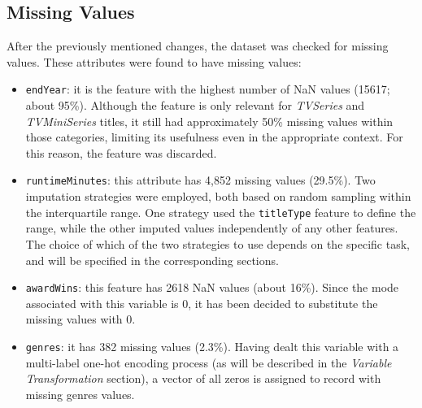\subsection{Missing Values}
After the previously mentioned changes, the dataset was checked for missing values.
These attributes were found to have missing values:
\begin{itemize}
    \item \texttt{endYear}: it is the feature with the highest number of NaN values (15617; about 95\%).
    Although the feature is only relevant for \textit{TVSeries} and \textit{TVMiniSeries} titles, it still
    had approximately 50\% missing values within those categories, limiting its usefulness even in the
    appropriate context. For this reason, the feature was discarded.
    
    \item \texttt{runtimeMinutes}: this attribute has 4,852 missing values (29.5\%). Two imputation strategies were employed, both based on random sampling within the interquartile range. 
    One strategy used the \texttt{titleType} feature to define the range, while the other imputed values independently of any other features. 
    The choice of which of the two strategies to use depends on the specific task, and will be specified in the corresponding sections.
    
    \item \texttt{awardWins}: this feature has 2618 NaN values (about 16\%).
    Since the mode associated with this variable is 0, it has been decided to substitute the missing
    values with 0.

    \item \texttt{genres}: it has 382 missing values (2.3\%). Having dealt this variable with a
    multi-label one-hot encoding process (as will be described in the \textit{Variable Transformation}
    section), a vector of all zeros is assigned to record with missing genres values.
\end{itemize}



